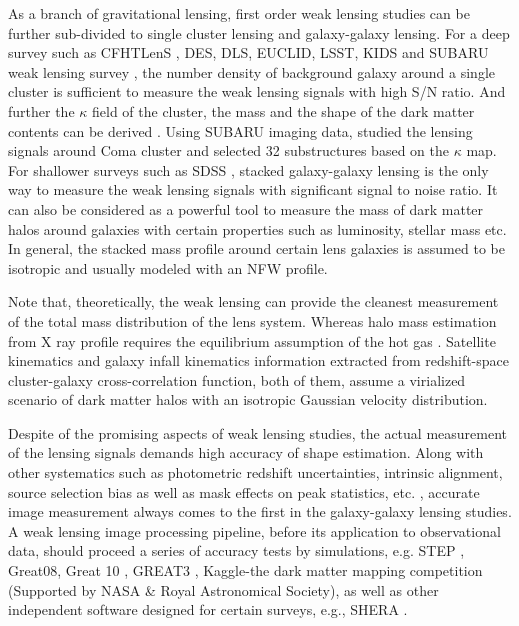 \documentclass[apj]{emulateapj}
\begin{document}
As a branch of gravitational lensing, first order weak lensing studies can be
further sub-divided to single cluster lensing and galaxy-galaxy
lensing. For a deep survey such as CFHTLenS \citep{Heymans2012}, 
DES\citep{Jarvis2015}, DLS\citep{Wittman2006}, EUCLID\citep{Refregier2010},
LSST\citep{LSST2009}, KIDS\citep{Kuijken2015}
and SUBARU weak lensing survey \citep{Kaifu1998, Umetsu2007}, the number
density of background galaxy around a single cluster is sufficient to
measure the weak lensing signals with high S/N ratio. And further the
$\kappa$ field of the cluster, the mass and the shape of the dark
matter contents can be derived \citep{Oguri2010}. Using SUBARU imaging
data, \citet{Okabe2014} studied the lensing signals around Coma
cluster and selected 32 substructures based on the $\kappa$ map.  For
shallower surveys such as SDSS \citep{York2000}, stacked galaxy-galaxy
lensing is the only way to measure the weak lensing signals with
significant signal to noise ratio. It can also be considered as a
powerful tool to measure the mass of dark matter halos around galaxies
with certain properties such as luminosity, stellar mass etc.  In
general, the stacked mass profile around certain lens galaxies is
assumed to be isotropic and usually modeled with an NFW
\citep{NFW1997} profile.


Note that, theoretically, the weak lensing can provide the cleanest
measurement of the total mass distribution of the lens system.
Whereas halo mass estimation from X ray profile requires the
equilibrium assumption of the hot gas \citep{Wang2014}. Satellite
kinematics\citep{Bosch2004} and galaxy infall kinematics
\citep[GIK]{Zu2013,Zu2014} information extracted from redshift-space
cluster-galaxy cross-correlation function, both of them, assume a
virialized scenario of dark matter halos with an isotropic Gaussian
velocity distribution.


Despite of the promising aspects of weak lensing studies, the actual
measurement of the lensing signals demands high accuracy of shape
estimation. Along with other systematics such as photometric redshift
uncertainties, intrinsic alignment, source selection bias as well as
mask effects on peak statistics, etc. \citep{Yang2003,Mandelbaum2005,
  Mandelbaum2006, Yang2006a, Mandelbaum2008, Mandelbaum2009a,
  Mandelbaum2009b, Li2009, Sheldon2009, Liu2014}, accurate image
measurement always comes to the first in the galaxy-galaxy lensing
studies. A weak lensing image processing pipeline, before its
application to observational data, should proceed a series of accuracy
tests by simulations, e.g. STEP \citep[Shear TEsting Program,
][]{Heymans2006, Massey2007}, Great08\citep{Bridle2009}, Great 10
\citep{Kitching2010}, GREAT3\citep{Mandelbaum2014} , Kaggle-the dark
matter mapping competition (Supported by NASA \& Royal Astronomical
Society), as well as other independent software designed for certain
surveys, e.g., SHERA \citep[hereafter M12]{Mandelbaum2012}.
\end{document}
